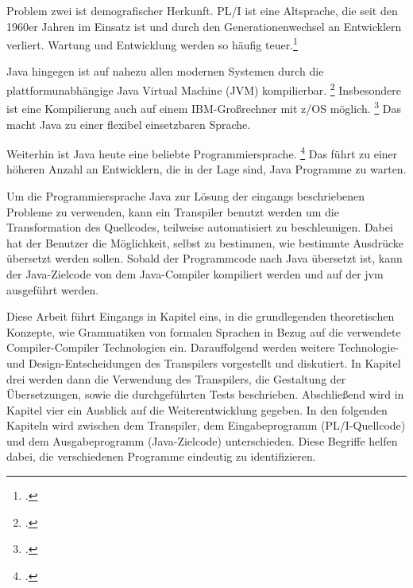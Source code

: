 Problem zwei ist demografischer Herkunft. PL/I ist eine Altsprache, die seit den 1960er Jahren im Einsatz ist und durch den Generationenwechsel an Entwicklern verliert. Wartung und Entwicklung werden so häufig teuer.\footcite[Vgl. ][S. 227ff.]{histopli} 

Java hingegen ist auf nahezu allen modernen Systemen durch die plattformunabhängige Java Virtual Machine (JVM) kompilierbar. \footcite[Vgl. ][]{jvm}
Insbesondere ist eine Kompilierung auch auf einem IBM-Großrechner mit z/OS möglich. \footcite[Vgl. ][]{zos} 
Das macht Java zu einer flexibel einsetzbaren Sprache. 

Weiterhin ist Java heute eine beliebte Programmiersprache. \footcite[Vgl. ][]{tiobe} Das führt zu einer höheren Anzahl an Entwicklern, die in der Lage sind, Java Programme zu warten.

Um die Programmiersprache Java zur Lösung der eingangs beschriebenen Probleme zu verwenden, kann ein Transpiler benutzt werden um die Transformation des Quellcodes, teilweise automatisiert zu beschleunigen. 
Dabei hat der Benutzer die Möglichkeit, selbst zu bestimmen, wie bestimmte Ausdrücke übersetzt werden sollen. Sobald der Programmcode nach Java übersetzt ist, kann der Java-Zielcode von dem Java-Compiler kompiliert werden und auf der \ac{jvm} ausgeführt werden.

Diese Arbeit führt Eingangs in Kapitel eins, in die grundlegenden theoretischen Konzepte, wie Grammatiken von formalen Sprachen in Bezug auf die verwendete Compiler-Compiler Technologien ein. Darauffolgend werden weitere Technologie- und Design-Entscheidungen des Transpilers vorgestellt und diskutiert. In Kapitel drei werden dann die Verwendung des Transpilers, die Gestaltung der Übersetzungen, sowie die durchgeführten Tests beschrieben. Abschließend wird in Kapitel vier ein Ausblick auf die Weiterentwicklung gegeben.
In den folgenden Kapiteln wird zwischen dem Transpiler, dem Eingabeprogramm (PL/I-Quellcode) und dem Ausgabeprogramm (Java-Zielcode) unterschieden. Diese Begriffe helfen dabei, die verschiedenen Programme eindeutig zu identifizieren. 


     


